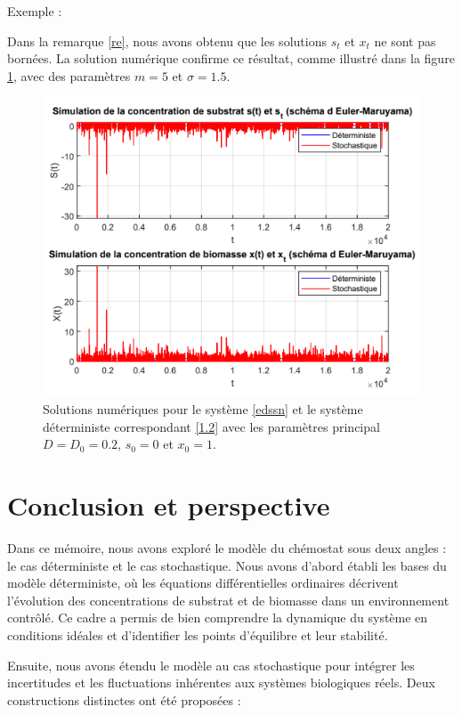 \documentclass[12pt,a4paper]{report}%
\newcounter{PP}[chapter]
\newenvironment{exemple}[2][]
  {\refstepcounter{PP}
  \begin{bclogo}[
    logo=\bccrayon , %
    couleur=white,
    arrondi=0.1,
    barre =snake,
     tailleOndu = 1.5,
    couleurBord=white,#1]{Exemple \thePP:#2}
  }
  {\end{bclogo}}
\begin{document}
\begin{exemple}{}
	Dans la remarque \ref{re}, nous avons obtenu que les solutions $s_t$ et $x_t$ ne sont pas bornées. La solution numérique confirme ce résultat, comme illustré dans la figure \ref{fig:fgure5}, avec des paramètres $m=5$ et $\sigma=1.5$.
\end{exemple}


\begin{figure}[h]
	\centering
	\includegraphics[width=1.05\textwidth]{e5.png} 
	\caption{Solutions numériques pour le système \eqref{edssn} et le système déterministe correspondant \eqref{1.2} avec les paramètres principal \(D= D_0 = 0.2 \), $s_0=0$ et $x_0=1$.}
	\label{fig:fgure5}
\end{figure}


\chapter*{Conclusion et perspective}
Dans ce mémoire, nous avons exploré le modèle du chémostat sous deux angles : le cas déterministe et le cas stochastique. Nous avons d'abord établi les bases du modèle déterministe, où les équations différentielles ordinaires décrivent l'évolution des concentrations de substrat et de biomasse dans un environnement contrôlé. Ce cadre a permis de bien comprendre la dynamique du système en conditions idéales et d'identifier les points d'équilibre et leur stabilité.\\
\vspace*{0.1cm}

Ensuite, nous avons étendu le modèle au cas stochastique pour intégrer les incertitudes et les fluctuations inhérentes aux systèmes biologiques réels. Deux constructions distinctes ont été proposées :
\end{document}
